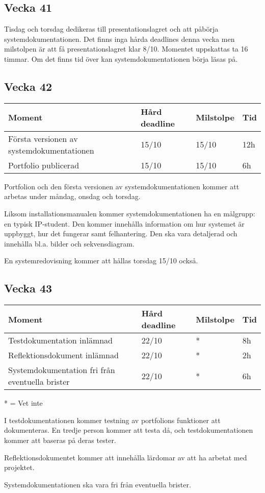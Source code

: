 \documentclass{TDP003mall}
\begin{document}
\subsection*{Vecka 41}
Tisdag och torsdag dedikeras till presentationslagret och att påbörja systemdokumentationen. Det finns inga hårda deadlines denna vecka men milstolpen är att få presentationslagret klar 8/10. Momentet uppskattas ta 16 timmar. Om det finns tid över kan systemdokumentationen börja läsas på.

\subsection*{Vecka 42}
\begin{table}[!h]
\begin{tabularx}{\linewidth}{|X|l|l|l|}
\hline
Moment & Hård deadline & Milstolpe & Tid \\\hline
Första versionen av systemdokumentationen & 15/10 & 15/10 & 12h \\\hline
Portfolio publicerad & 15/10 & 15/10 & 6h \\\hline
\end{tabularx}
\end{table}

Portfolion och den första versionen av systemdokumentationen kommer att arbetas under måndag, onsdag och torsdag.

Liksom installationsmanualen kommer systemdokumentationen ha en målgrupp: en typisk IP-student. Den kommer innehålla information om hur systemet är uppbyggt, hur det fungerar samt felhantering. Den ska vara detaljerad och innehålla bl.a. bilder och sekvensdiagram.

En systemredovisning kommer att hållas torsdag 15/10 också.

\subsection*{Vecka 43}
\begin{table}[!h]
\begin{tabularx}{\linewidth}{|X|l|l|l|}
\hline
Moment & Hård deadline & Milstolpe & Tid \\\hline
Testdokumentation inlämnad & 22/10 & * & 8h \\\hline
Reflektionsdokument inlämnad & 22/10 & * & 2h \\\hline
Systemdokumentation fri från eventuella brister & 22/10 & * & 6h \\\hline
\end{tabularx}
\end{table}
* = Vet inte

I testdokumentationen kommer testning av portfolions funktioner att dokumenteras. En tredje person kommer att testa då, och testdokumentationen kommer att baseras på deras tester.

Reflektionsdokumentet kommer att innehålla lärdomar av att ha arbetat med projektet.

Systemdokumentationen ska vara fri från eventuella brister.
\end{document}
